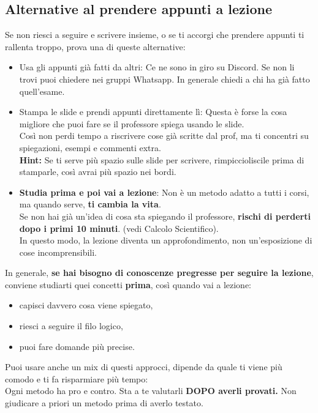 \documentclass[18pt]{extarticle}
\begin{document}
\subsection{Alternative al prendere appunti a lezione}
Se non riesci a seguire e scrivere insieme, o se ti accorgi che prendere appunti ti rallenta troppo, prova una di queste alternative:
\begin{itemize}
\item Usa gli appunti già fatti da altri: Ce ne sono in giro su Discord. Se non li trovi puoi chiedere nei gruppi Whatsapp. In generale chiedi a chi ha già fatto quell'esame.
\item Stampa le slide e prendi appunti direttamente lì: Questa è forse la cosa migliore che puoi fare se il professore spiega usando le slide.\\
  Così non perdi tempo a riscrivere cose già scritte dal prof, ma ti concentri su spiegazioni, esempi e commenti extra.\\
  \textbf{Hint:} Se ti serve più spazio sulle slide per scrivere, rimpiccioliscile prima di stamparle, così avrai più spazio nei bordi.
\item \textbf{Studia prima e poi vai a lezione}: Non è un metodo adatto a tutti i corsi, ma quando serve, \textbf{ti cambia la vita}.\\
  Se non hai già un'idea di cosa sta spiegando il professore, \textbf{rischi di perderti dopo i primi 10 minuti}. (vedi Calcolo Scientifico).\\
  In questo modo, la lezione diventa un approfondimento, non un'esposizione di cose incomprensibili.
\end{itemize}
In generale, \textbf{se hai bisogno di conoscenze pregresse per seguire la lezione}, conviene studiarti quei concetti \textbf{prima}, così quando vai a lezione:
\begin{itemize}
\item capisci davvero cosa viene spiegato,
\item riesci a seguire il filo logico,
\item puoi fare domande più precise.
\end{itemize}
Puoi usare anche un mix di questi approcci, dipende da quale ti viene più comodo e ti fa risparmiare più tempo:\\
Ogni metodo ha pro e contro. Sta a te valutarli \textbf{DOPO averli provati.} Non giudicare a priori un metodo prima di averlo testato.
\end{document}
